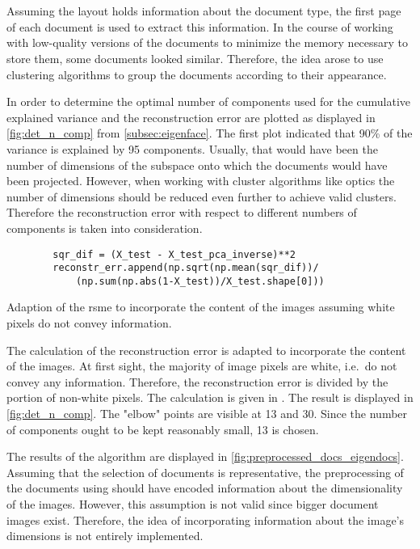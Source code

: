 \section{\eigendocs{}}\label{sec:evaluation-eigendocs}
Assuming the layout holds information about the document type, the first page of each document is used to extract this information.
In the course of working with low-quality versions of the documents to minimize the memory necessary to store them, some documents looked similar.
Therefore, the idea arose to use clustering algorithms to group the documents according to their appearance.

In order to determine the optimal number of components used for \eigendocs{} the cumulative explained variance and the reconstruction error are plotted 
as displayed in \autoref{fig:det_n_comp} from \autoref{subsec:eigenface}.
The first plot indicated that 90\% of the variance is explained by 95 components.
Usually, that would have been the number of dimensions of the subspace onto which the documents would have been projected.
However, when working with cluster algorithms like \ac{optics} the number of dimensions should be reduced even further to achieve valid clusters.
Therefore the reconstruction error with respect to different numbers of components is taken into consideration.

\begin{listing}[htp]
    \begin{verbatim}
        sqr_dif = (X_test - X_test_pca_inverse)**2
        reconstr_err.append(np.sqrt(np.mean(sqr_dif))/
            (np.sum(np.abs(1-X_test))/X_test.shape[0])) 
    \end{verbatim}
    \caption[Adaption of the \ac{rsme}]{
        Adaption of the \ac{rsme} to incorporate the content of the images assuming white pixels do not convey information.
    }
    \label{lst:impl-weighted-rsme}
\end{listing}

The calculation of the reconstruction error is adapted to incorporate the content of the images.
At first sight, the majority of image pixels are white, i.e.\ do not convey any information.
Therefore, the reconstruction error is divided by the portion of non-white pixels. 
The calculation is given in .
The result is displayed in \autoref{fig:det_n_comp}.
The "elbow" points are visible at 13 and 30.
Since the number of components ought to be kept reasonably small, 13 is chosen.


The results of the \eigendocs{} algorithm are displayed in \autoref{fig:preprocessed_docs_eigendocs}.
Assuming that the selection of documents is representative, 
the preprocessing of the documents using \eigendocs{} should have encoded information about the dimensionality of the images.
However, this assumption is not valid since bigger document images exist.
Therefore, the idea of incorporating information about the image's dimensions is not entirely implemented.